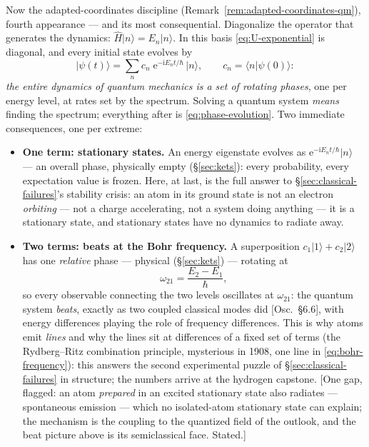 \documentclass[11pt]{article}
\theoremstyle{plain}
\theoremstyle{definition}
\theoremstyle{remark}
\newcommand{\ee}{\mathrm{e}}
\newcommand{\ii}{\mathrm{i}}
\newcommand{\op}[1]{\hat{#1}}
\newcommand{\ket}[1]{\lvert #1 \rangle}
\newcommand{\braket}[2]{\langle #1 | #2 \rangle}
\begin{document}
Now the adapted-coordinates discipline
(Remark~\ref{rem:adapted-coordinates-qm}), fourth appearance ---
and its most consequential. Diagonalize the operator that generates the
dynamics: $\op H\ket n = E_n\ket n$. In this basis
\eqref{eq:U-exponential} is diagonal, and every initial state
evolves by
\begin{equation}
  \boxed{\;
  \ket{\psi(t)}
  = \sum_n c_n\;\ee^{-\ii E_n t/\hbar}\,\ket n,
  \qquad
  c_n = \braket n{\psi(0)} :
  \;}
  \label{eq:phase-evolution}
\end{equation}
\emph{the entire dynamics of quantum mechanics is a set of rotating
phases}, one per energy level, at rates set by the spectrum. Solving
a quantum system \emph{means} finding the spectrum; everything after
is \eqref{eq:phase-evolution}. Two immediate consequences, one per
extreme:
\begin{itemize}
  \item \textbf{One term: stationary states.} An energy eigenstate
  evolves as $\ee^{-\ii E_n t/\hbar}\ket n$ --- an overall phase,
  physically empty (\S\ref{sec:kets}): every probability, every
  expectation value is frozen. Here, at last, is the full answer to
  \S\ref{sec:classical-failures}'s stability crisis: an atom in its
  ground state is not an electron \emph{orbiting} --- not a charge
  accelerating, not a system doing anything --- it is a stationary
  state, and stationary states have no dynamics to radiate away.
  \item \textbf{Two terms: beats at the Bohr frequency.} A
  superposition $c_1\ket 1 + c_2\ket 2$ has one \emph{relative}
  phase --- physical (\S\ref{sec:kets}) --- rotating at
  \begin{equation}
    \omega_{21} = \frac{E_2 - E_1}{\hbar},
    \label{eq:bohr-frequency}
  \end{equation}
  so every observable connecting the two levels oscillates at
  $\omega_{21}$: the quantum system \emph{beats}, exactly as two
  coupled classical modes did [Osc.\ \S6.6], with energy differences
  playing the role of frequency differences. This is why atoms emit
  \emph{lines} and why the lines sit at differences of a fixed set
  of terms (the Rydberg--Ritz combination principle, mysterious in
  1908, one line in \eqref{eq:bohr-frequency}): this answers the second
  experimental puzzle of \S\ref{sec:classical-failures} in structure;
  the numbers arrive at the hydrogen capstone. [One gap,
  flagged: an atom \emph{prepared} in an excited stationary state
  also radiates --- spontaneous emission --- which no isolated-atom
  stationary state can explain; the mechanism is the coupling to the
  quantized field of the outlook, and the beat picture above is its
  semiclassical face. Stated.]
\end{itemize}
\end{document}
